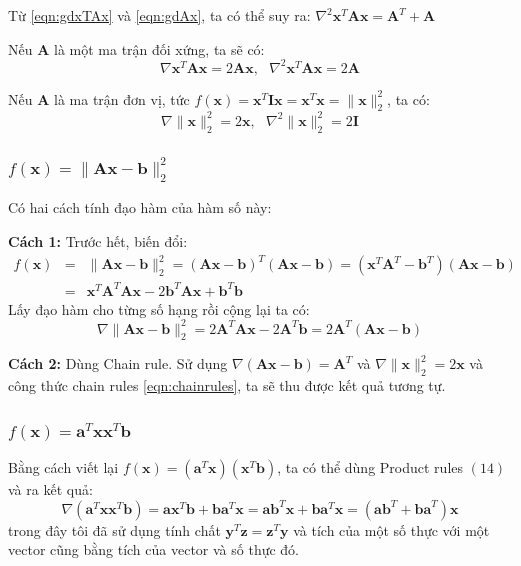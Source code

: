 \documentclass[12pt]{article}
\begin{document}
 
Từ \eqref{eqn:gdxTAx} và \eqref{eqn:gdAx}, ta có thể suy ra:  
\begin{math} 
\nabla^2 \mathbf{x}^T\mathbf{Ax} = \mathbf{A}^T + \mathbf{A} 
\end{math} 
 
Nếu $\mathbf{A}$ là một ma trận đối xứng, ta sẽ có: 
\begin{equation} 
\nabla \mathbf{x}^T\mathbf{A}\mathbf{x} = 2\mathbf{Ax}, ~~~
\nabla^2 \mathbf{x}^T\mathbf{Ax} = 2\mathbf{A} 
\end{equation} 
 
Nếu $\mathbf{A}$ là ma trận đơn vị, tức $f(\mathbf{x}) = \mathbf{x}^T\mathbf{Ix} = \mathbf{x}^T\mathbf{x} = \|\mathbf{x}\|_2^2$, ta có: 
\begin{equation} 
\nabla \|\mathbf{x}\|_2^2 = 2\mathbf{x},~~~
\nabla^2 \|\mathbf{x}\|_2^2 = 2\mathbf{I} 
\end{equation} 
 
 
\subsubsection{$f(\mathbf{x}) = \|\mathbf{Ax} - \mathbf{b}\|_2^2 $}
Có hai cách tính đạo hàm của hàm số này: 
 
\textbf{Cách 1:} 
Trước hết, biến đổi: 
\begin{eqnarray} 
	\nonumber
	f(\mathbf{x}) &=& \|\mathbf{Ax} - \mathbf{b}\|_2^2 = (\mathbf{Ax} - \mathbf{b})^T(\mathbf{Ax} - \mathbf{b}) = (\mathbf{x}^T\mathbf{A}^T - \mathbf{b}^T) (\mathbf{Ax} - \mathbf{b}) \\\ \nonumber
	&=& \mathbf{x}^T\mathbf{A}^T\mathbf{Ax} - 2 \mathbf{b}^T\mathbf{Ax} + \mathbf{b}^T\mathbf{b} 
\end{eqnarray} 
Lấy đạo hàm cho từng số hạng rồi cộng lại ta có:  
\begin{equation*} 
\nabla \|\mathbf{Ax} - \mathbf{b}\|_2^2 = 2\mathbf{A}^T\mathbf{A}\mathbf{x} - 2\mathbf{A}^T\mathbf{b} = 2\mathbf{A}^T(\mathbf{Ax} - \mathbf{b}) 
\end{equation*} 
 
\textbf{Cách 2:} Dùng Chain rule. 
Sử dụng $\nabla (\mathbf{Ax} - \mathbf{b}) = \mathbf{A}^T$ và $\nabla \|\mathbf{x}\|_2^2 = 2\mathbf{x}$ và công thức chain rules \eqref{eqn:chainrules}, ta sẽ thu được kết quả tương tự.  
 
 
\subsubsection{$f(\mathbf{x}) = \mathbf{a}^T\mathbf{x}\mathbf{x}^T\mathbf{b}$}
Bằng cách viết lại $f(\mathbf{x}) = (\mathbf{a}^T\mathbf{x})(\mathbf{x}^T\mathbf{b})$, ta có thể dùng Product rules $(14)$ và ra kết quả:  
\begin{equation*} 
	\nabla (\mathbf{a}^T\mathbf{x}\mathbf{x}^T\mathbf{b}) = \mathbf{a} \mathbf{x}^T\mathbf{b} +  \mathbf{b}\mathbf{a}^T\mathbf{x} = \mathbf{ab}^T\mathbf{x} + \mathbf{b}\mathbf{a}^T\mathbf{x}= (\mathbf{ab}^T + \mathbf{ba}^T)\mathbf{x} 
\end{equation*} 
trong đây tôi đã sử dụng tính chất $\mathbf{y}^T\mathbf{z} = \mathbf{z}^T\mathbf{y}$ và tích của một số thực với một vector cũng bằng tích của vector và số thực đó.  
 
\end{document}
